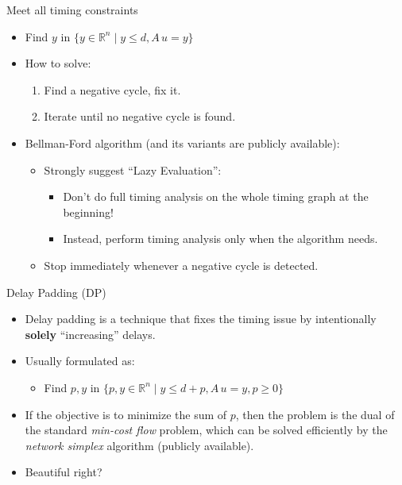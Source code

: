 \documentclass[10pt,ignorenonframetext,mathserif]{beamer}
\providecommand{\tightlist}{%
  \setlength{\itemsep}{0pt}\setlength{\parskip}{0pt}}
\begin{document}
\begin{frame}{Meet all timing constraints}

\begin{itemize}
\tightlist
\item
  Find \(y\) in \(\{y \in \mathbb{R}^n \mid y \leq d, A\,u = y\}\)
\item
  How to solve:

  \begin{enumerate}
  \def\labelenumi{\arabic{enumi}.}
  \tightlist
  \item
    Find a negative cycle, fix it.
  \item
    Iterate until no negative cycle is found.
  \end{enumerate}
\item
  Bellman-Ford algorithm (and its variants are publicly available):

  \begin{itemize}
  \tightlist
  \item
    Strongly suggest ``Lazy Evaluation'':

    \begin{itemize}
    \tightlist
    \item
      Don't do full timing analysis on the whole timing graph at the
      beginning!
    \item
      Instead, perform timing analysis only when the algorithm needs.
    \end{itemize}
  \item
    Stop immediately whenever a negative cycle is detected.
  \end{itemize}
\end{itemize}

\end{frame}

\begin{frame}{Delay Padding (DP)}

\begin{itemize}
\tightlist
\item
  Delay padding is a technique that fixes the timing issue by
  intentionally \textbf{solely} ``increasing'' delays.
\item
  Usually formulated as:

  \begin{itemize}
  \tightlist
  \item
    Find \(p, y\) in
    \(\{p, y \in \mathbb{R}^n \mid y \leq d + p, A\,u = y, p \geq 0\}\)
  \end{itemize}
\item
  If the objective is to minimize the sum of \(p\), then the problem is
  the dual of the standard \emph{min-cost flow} problem, which can be
  solved efficiently by the \emph{network simplex} algorithm (publicly
  available).
\item
  Beautiful right?
\end{itemize}

\end{frame}
\end{document}
